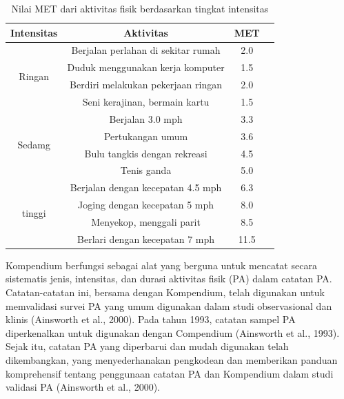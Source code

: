 \begin{longtable}{|c|c|c|c|}
  \caption{Nilai MET dari aktivitas fisik berdasarkan tingkat intensitas}
  \label{tb:metintensitas}  \\
  \hline
  \rowcolor[HTML]{C0C0C0}
  \textbf{Intensitas} & \textbf{Aktivitas} & \textbf{MET} \\
  \hline
  \multirow{4}{*}{Ringan}     & Berjalan perlahan di sekitar rumah      & 2.0     \\
  \cline{2-3} &
                                Duduk menggunakan kerja komputer        & 1.5     \\
  \cline{2-3} &
                                Berdiri melakukan pekerjaan ringan      & 2.0     \\
  \cline{2-3} &
                                Seni kerajinan, bermain kartu           & 1.5    \\
  \hline
  \multirow{4}{*}{Sedamg}     & Berjalan 3.0 mph                        & 3.3     \\
  \cline{2-3} &
                                Pertukangan umum                        & 3.6    \\
  \cline{2-3} &
                                Bulu tangkis dengan rekreasi            & 4.5    \\
  \cline{2-3} &
                                Tenis ganda                             & 5.0    \\
  \hline
  \multirow{4}{*}{tinggi}     & Berjalan dengan kecepatan 4.5 mph       & 6.3    \\
  \cline{2-3} &
                                Joging dengan kecepatan 5 mph           & 8.0    \\
  \cline{2-3} &
                                Menyekop, menggali parit                & 8.5    \\
  \cline{2-3} &
                                Berlari dengan kecepatan 7 mph          & 11.5    \\
  \hline
\end{longtable}

Kompendium berfungsi sebagai alat yang berguna untuk mencatat secara sistematis jenis, intensitas, dan durasi aktivitas fisik (PA) dalam catatan PA. Catatan-catatan ini, bersama dengan Kompendium, telah digunakan untuk memvalidasi survei PA yang umum digunakan dalam studi observasional dan klinis (Ainsworth et al., 2000). Pada tahun 1993, catatan sampel PA diperkenalkan untuk digunakan dengan Compendium (Ainsworth et al., 1993). Sejak itu, catatan PA yang diperbarui dan mudah digunakan telah dikembangkan, yang menyederhanakan pengkodean dan memberikan panduan komprehensif tentang penggunaan catatan PA dan Kompendium dalam studi validasi PA (Ainsworth et al., 2000).


